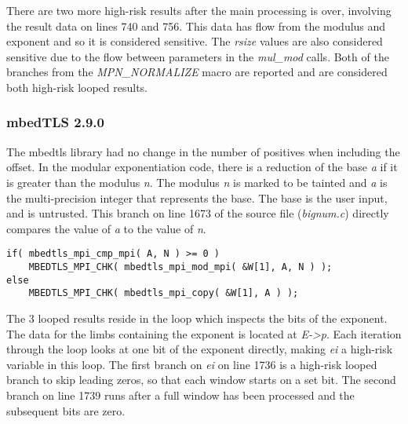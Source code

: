 \documentclass[11pt,a4paper]{article}
\newcommand{\codevar}[1]{\textit{#1}}
\newcommand{\codefn}[1]{\textit{#1}}
\newcommand{\codefile}[1]{\textit{#1}}
\newcommand{\ruleabove}{}
\newcommand{\rulebelow}{}
\begin{document}
There are two more high-risk results after the main processing is over,
involving the result data on lines 740 and 756. This data has flow from the
modulus and exponent and so it is considered sensitive. The \codevar{rsize} values are
also considered sensitive due to the flow between parameters in the
\codefn{mul\_mod} calls. Both of the branches from the \codefn{MPN\_NORMALIZE}
macro are reported and are considered both high-risk looped results.

\subsubsection{mbedTLS 2.9.0}

The mbedtls library had no change in the number of positives when including the
offset. In the modular exponentiation code, there is a reduction of the base \codevar{a}
if it is greater than the modulus \codevar{n}. The modulus \codevar{n} is marked to be tainted
and \codevar{a} is the multi-precision integer that represents the base. The base is the
user input, and is untrusted. This branch on line 1673 of the source file (\codefile{bignum.c})
directly compares the value of \codevar{a} to the value of \codevar{n}.

\ruleabove
\begin{lstlisting}[caption=mbed TLS 2.9.0 - bignum.c lines 1673-1676]
if( mbedtls_mpi_cmp_mpi( A, N ) >= 0 )
    MBEDTLS_MPI_CHK( mbedtls_mpi_mod_mpi( &W[1], A, N ) );
else
    MBEDTLS_MPI_CHK( mbedtls_mpi_copy( &W[1], A ) );
\end{lstlisting}
\rulebelow

The 3 looped results reside in the loop which inspects the bits of the exponent.
The data for the limbs containing the exponent is located at \codevar{E->p}. Each
iteration through the loop looks at one bit of the exponent directly, making
\codevar{ei} a high-risk variable in this loop. The first branch on \codevar{ei} on line 1736 is
a high-risk looped branch to skip leading zeros, so that each window starts on a
set bit. The second branch on line 1739 runs after a full window has been
processed and the subsequent bits are zero.
\end{document}

